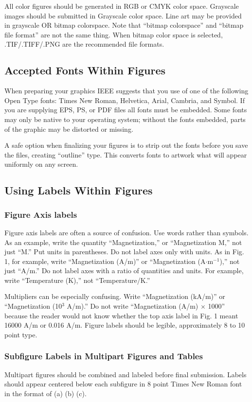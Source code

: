 \documentclass{ieeeaccess}
\begin{document}
All color figures should be generated in RGB or CMYK color space. Grayscale
images should be submitted in Grayscale color space. Line art may be provided
in grayscale OR bitmap colorspace. Note that ``bitmap colorspace'' and ``bitmap
file format'' are not the same thing. When bitmap color space is selected,
.TIF/.TIFF/.PNG are the recommended file formats.

\subsection{Accepted Fonts Within Figures}
When preparing your graphics IEEE suggests that you use of one of the following
Open Type fonts: Times New Roman, Helvetica, Arial, Cambria, and Symbol. If you
are supplying EPS, PS, or PDF files all fonts must be embedded. Some fonts may
only be native to your operating system; without the fonts embedded, parts of
the graphic may be distorted or missing.

A safe option when finalizing your figures is to strip out the fonts before you
save the files, creating ``outline'' type. This converts fonts to artwork what
will appear uniformly on any screen.

\subsection{Using Labels Within Figures}

\subsubsection{Figure Axis labels }
Figure axis labels are often a source of confusion. Use words rather than
symbols. As an example, write the quantity ``Magnetization,'' or
``Magnetization M,'' not just ``M.'' Put units in parentheses. Do not label
axes only with units. As in Fig. 1, for example, write ``Magnetization (A/m)''
or ``Magnetization (A$\cdot$m$^{-1}$),'' not just ``A/m.'' Do not label axes
with a ratio of quantities and units. For example, write ``Temperature (K),''
not ``Temperature/K.''

Multipliers can be especially confusing. Write ``Magnetization (kA/m)'' or
``Magnetization (10$^{3}$ A/m).'' Do not write ``Magnetization
(A/m)$\,\times\,$1000'' because the reader would not know whether the top axis
label in Fig. 1 meant 16000 A/m or 0.016 A/m. Figure labels should be legible,
approximately 8 to 10 point type.

\subsubsection{Subfigure Labels in Multipart Figures and Tables}
Multipart figures should be combined and labeled before final submission.
Labels should appear centered below each subfigure in 8 point Times New Roman
font in the format of (a) (b) (c).
\end{document}
